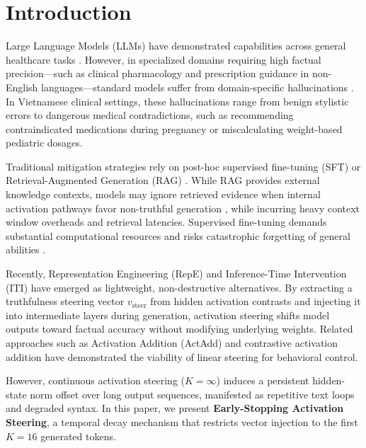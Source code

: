 \section{Introduction}
Large Language Models (LLMs) have demonstrated capabilities across general healthcare tasks \cite{ref3}. However, in specialized domains requiring high factual precision---such as clinical pharmacology and prescription guidance in non-English languages---standard models suffer from domain-specific hallucinations \cite{ref7}. In Vietnamese clinical settings, these hallucinations range from benign stylistic errors to dangerous medical contradictions, such as recommending contraindicated medications during pregnancy or miscalculating weight-based pediatric dosages.

Traditional mitigation strategies rely on post-hoc supervised fine-tuning (SFT) \cite{ref10} or Retrieval-Augmented Generation (RAG) \cite{ref5}. While RAG provides external knowledge contexts, models may ignore retrieved evidence when internal activation pathways favor non-truthful generation \cite{ref11}, while incurring heavy context window overheads and retrieval latencies. Supervised fine-tuning demands substantial computational resources and risks catastrophic forgetting of general abilities \cite{ref12}.

Recently, Representation Engineering (RepE) \cite{ref1} and Inference-Time Intervention (ITI) \cite{ref2} have emerged as lightweight, non-destructive alternatives. By extracting a truthfulness steering vector $v_{\text{steer}}$ from hidden activation contrasts and injecting it into intermediate layers during generation, activation steering shifts model outputs toward factual accuracy without modifying underlying weights. Related approaches such as Activation Addition (ActAdd) \cite{ref8} and contrastive activation addition \cite{ref9} have demonstrated the viability of linear steering for behavioral control.

However, continuous activation steering ($K=\infty$) induces a persistent hidden-state norm offset over long output sequences, manifested as repetitive text loops and degraded syntax. In this paper, we present \textbf{Early-Stopping Activation Steering}, a temporal decay mechanism that restricts vector injection to the first $K=16$ generated tokens.

